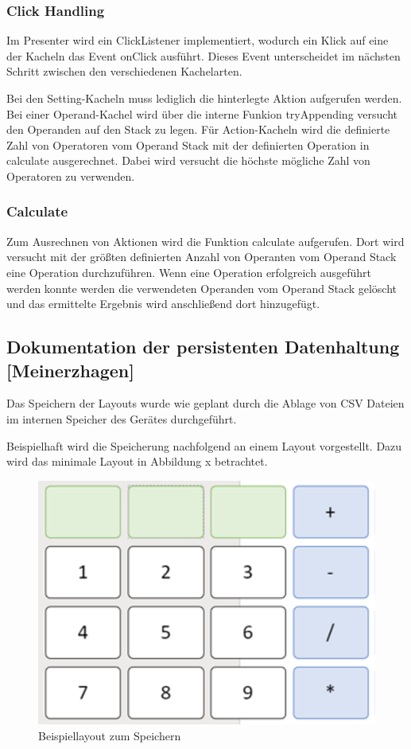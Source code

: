 \subsubsection{Click Handling}

Im Presenter wird ein ClickListener implementiert, wodurch ein Klick auf eine der Kacheln das Event onClick ausführt. Dieses Event unterscheidet im nächsten Schritt zwischen den verschiedenen Kachelarten.

Bei den Setting-Kacheln muss lediglich die hinterlegte Aktion aufgerufen werden. Bei einer Operand-Kachel wird über die interne Funkion tryAppending versucht den Operanden auf den Stack zu legen. Für Action-Kacheln wird die definierte Zahl von Operatoren vom Operand Stack mit der definierten Operation in calculate ausgerechnet. Dabei wird versucht die höchste mögliche Zahl von Operatoren zu verwenden.

\subsubsection{Calculate}

Zum Ausrechnen von Aktionen wird die Funktion calculate aufgerufen. Dort wird versucht mit der größten definierten Anzahl von Operanten vom Operand Stack eine Operation durchzuführen. Wenn eine Operation erfolgreich ausgeführt werden konnte werden die verwendeten Operanden vom Operand Stack gelöscht und das ermittelte Ergebnis wird anschließend dort hinzugefügt.

\subsection{Dokumentation der persistenten Datenhaltung [Meinerzhagen]}

Das Speichern der Layouts wurde wie geplant durch die Ablage von CSV Dateien im internen Speicher des Gerätes durchgeführt. 

Beispielhaft wird die Speicherung nachfolgend an einem Layout vorgestellt. Dazu wird das minimale Layout in Abbildung x betrachtet.  

\begin{figure}[h]
	\includegraphics[scale=1]{img/beispiellayout-zum-speichern}
	\caption[Beispiellayout zum Speichern]{Beispiellayout zum Speichern\footnotemark}
\end{figure}

